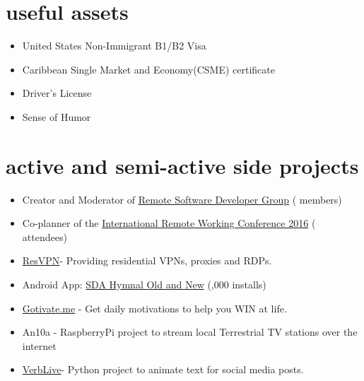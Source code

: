 \documentclass[]{friggeri-cv} %
\begin{document}

\section{useful assets}
\begin{itemize}
	\item United States Non-Immigrant B1/B2 Visa
    \item Caribbean Single Market and Economy(CSME) certificate
    \item Driver's License
    \item Sense of Humor
\end{itemize}


\section{active and semi-active side projects}
\begin{itemize}
	\item Creator and Moderator of {\href{http://remotesoftwaredeveloper.com}{Remote Software Developer Group}} ( members)
    \item Co-planner of the {\href{http://remoteworkingconf.com}{International Remote Working Conference 2016}} ( attendees)
    \item {\href{http://verblive.exterbox.com}{ResVPN}}- Providing residential VPNs, proxies and RDPs.
    \item Android App: {\href{https://play.google.com/store/apps/details?id=com.ionicframework.sdanewandoldhymnal816673&hl=en}{SDA Hymnal Old and New}} (,000 installs)
    \item {\href{http://gotivate.me}{Gotivate.me}} - Get daily motivations to help you WIN at life.
    \item An10a - RaspberryPi project to stream local Terrestrial TV stations over the internet
    \item {\href{http://verblive.exterbox.com}{VerbLive}}- Python project to animate text for social media posts.
\end{itemize}
\end{document}
